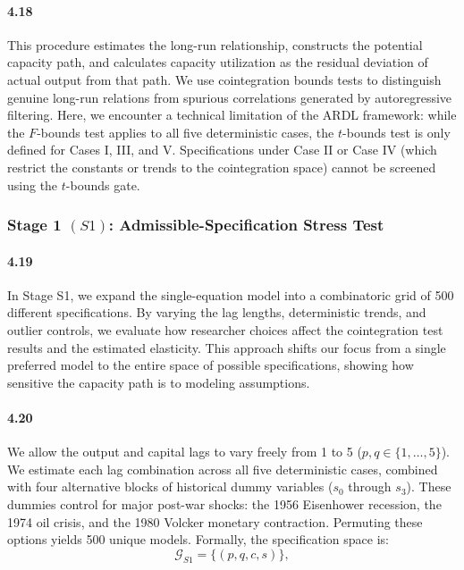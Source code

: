 \paragraph{4.18}
This procedure estimates the long-run relationship, constructs the potential capacity path, and calculates capacity utilization as the residual deviation of actual output from that path. We use cointegration bounds tests to distinguish genuine long-run relations from spurious correlations generated by autoregressive filtering. Here, we encounter a technical limitation of the ARDL framework: while the $F$-bounds test applies to all five deterministic cases, the $t$-bounds test is only defined for Cases I, III, and V. Specifications under Case II or Case IV (which restrict the constants or trends to the cointegration space) cannot be screened using the $t$-bounds gate.

\subsubsection{Stage 1 \texorpdfstring{$(S1)$}{}: Admissible-Specification Stress Test}
\label{subsec:S1_admissible_spec}

\paragraph{4.19}
In Stage S1, we expand the single-equation model into a combinatoric grid of 500 different specifications. By varying the lag lengths, deterministic trends, and outlier controls, we evaluate how researcher choices affect the cointegration test results and the estimated elasticity. This approach shifts our focus from a single preferred model to the entire space of possible specifications, showing how sensitive the capacity path is to modeling assumptions.

\paragraph{4.20}
We allow the output and capital lags to vary freely from 1 to 5 ($p, q \in \{1, \dots, 5\}$). We estimate each lag combination across all five deterministic cases, combined with four alternative blocks of historical dummy variables ($s_0$ through $s_3$). These dummies control for major post-war shocks: the 1956 Eisenhower recession, the 1974 oil crisis, and the 1980 Volcker monetary contraction. Permuting these options yields 500 unique models. Formally, the specification space is:
\begin{equation}
\mathcal{G}_{S1} = \{(p,q,c,s)\},
\label{eq:G_S1}
\end{equation}


